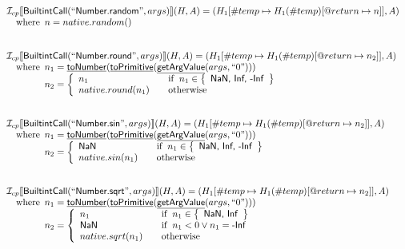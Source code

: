\documentclass{article}
\newcommand{\SF}[1]{\mbox{\textsf{#1}}}
\newcommand{\wherec}[1]{{\rm where}\begin{array}[t]{l}#1\end{array}}
\newcommand{\ifc}[1]{{\rm if}\begin{array}[t]{l}#1\end{array}}
\newcommand{\owc}{{\rm otherwise}}
\newcommand{\I}{\mathcal{I}}
\newcommand{\set}[1]{\left\{\begin{array}{l}#1\end{array}\right\}}
\newcommand{\lbr}{\llbracket}
\newcommand{\rbr}{\rrbracket}
\newcommand{\hf}[1]{\underline{\sf #1}}
\begin{document}
\[\begin{array}{l}
\I _{cp}\lbr \SF{BuiltintCall}(``\SF{Number.random}",args)\rbr(H,A)
  = (H_1[\#temp \mapsto H_1(\#temp)[@return \mapsto n]], A)\\
\quad\wherec{
  n = native.random() 
  }\\
\\\\


\I _{cp}\lbr \SF{BuiltintCall}(``\SF{Number.round}",args)\rbr(H,A)
  = (H_1[\#temp \mapsto H_1(\#temp)[@return \mapsto n_2]], A)\\
\quad\wherec{
  n_1 = \hf{toNumber}(\hf{toPrimitive}(\hf{getArgValue}(args, ``0")))\\
  n_2 = \left\{
    \begin{array}{l@{\quad\quad}l}
       n_1 & \ifc{n_1 \in \set{\SF{NaN, Inf, -Inf}}}\\
      native.round(n_1) & \owc 
    \end{array}
  \right.
  }\\
\\\\


\I _{cp}\lbr \SF{BuiltintCall}(``\SF{Number.sin}",args)\rbr(H,A)
  = (H_1[\#temp \mapsto H_1(\#temp)[@return \mapsto n_2]], A)\\
\quad\wherec{
  n_1 = \hf{toNumber}(\hf{toPrimitive}(\hf{getArgValue}(args, ``0")))\\
  n_2 = \left\{
    \begin{array}{l@{\quad\quad}l}
      \SF{NaN} & \ifc{n_1 \in \set{\SF{NaN, Inf, -Inf}}}\\
      native.sin(n_1) & \owc 
    \end{array}
  \right.
  }\\
\\\\


\I _{cp}\lbr \SF{BuiltintCall}(``\SF{Number.sqrt}",args)\rbr(H,A)
  = (H_1[\#temp \mapsto H_1(\#temp)[@return \mapsto n_2]], A)\\
\quad\wherec{
  n_1 = \hf{toNumber}(\hf{toPrimitive}(\hf{getArgValue}(args, ``0")))\\
  n_2 = \left\{
    \begin{array}{l@{\quad\quad}l}
      n_1 & \ifc{n_1 \in \set{\SF{NaN, Inf}}}\\
      \SF{NaN} & \ifc{n_1<0 \lor n_1=\SF{-Inf}}\\
      native.sqrt(n_1) & \owc
    \end{array}
  \right.
  }\\
\\\\



\end{array}\]
\end{document}
